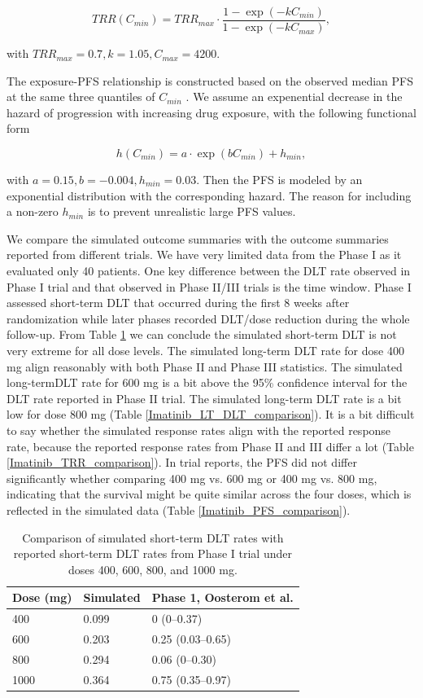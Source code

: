 \documentclass[11pt]{article}
\begin{document}
$$TRR(C_{min}) = TRR_{max} \cdot \frac{1-\exp (-kC_{min})}{1-\exp (-kC_{max})},$$

with $TRR_{max}=0.7, k=1.05, C_{max}=4200$.

The exposure-PFS relationship is constructed based on the observed median PFS at the same three quantiles of $C_{min}$ \parencite{demetri2009imatinib}. We assume an expenential decrease in the hazard of progression with increasing drug exposure, with the following functional form

$$h(C_{min}) = a \cdot \exp (bC_{min})+h_{min},$$

with $a=0.15, b=-0.004, h_{min}=0.03$. Then the PFS is modeled by an exponential distribution with the corresponding hazard. The reason for including a non-zero $h_{min}$ is to prevent unrealistic large PFS values. 

We compare the simulated outcome summaries with the outcome summaries reported from different trials. We have very limited data from the Phase I as it evaluated only 40 patients. One key difference between the DLT rate observed in Phase I trial and that observed in Phase II/III trials is the time window. Phase I assessed short-term DLT that occurred during the first 8 weeks after randomization while later phases recorded DLT/dose reduction during the whole follow-up. From Table \ref{Imatinib_ST_DLT_comparison} we can conclude the simulated short-term DLT is not very extreme for all dose levels. The simulated long-term DLT rate for dose 400 mg align reasonably with both Phase II and Phase III statistics. The simulated long-termDLT rate for 600 mg is a bit above the 95\% confidence interval for the DLT rate reported in Phase II trial. The simulated long-term DLT rate is a bit low for dose 800 mg (Table \ref{Imatinib_LT_DLT_comparison}). It is a bit difficult to say whether the simulated response rates align with the reported response rate, because the reported response rates from Phase II and III differ a lot (Table \ref{Imatinib_TRR_comparison}). In trial reports, the PFS did not differ significantly whether comparing 400 mg vs. 600 mg or 400 mg vs. 800 mg, indicating that the survival might be quite similar across the four doses, which is reflected in the simulated data (Table \ref{Imatinib_PFS_comparison}).

\begin{table}[htbp]
\centering
\caption{Comparison of simulated short-term DLT rates with reported short-term DLT rates from Phase I trial under doses 400, 600, 800, and 1000 mg.}
\label{Imatinib_ST_DLT_comparison}
\begin{tabular}{lll}
\toprule
\textbf{Dose (mg)} & \textbf{Simulated} & \textbf{Phase 1, Oosterom et al.} \\
\midrule
400  & 0.099 & 0 (0--0.37) \\
600  & 0.203 & 0.25 (0.03--0.65) \\
800  & 0.294 & 0.06 (0--0.30) \\
1000 & 0.364 & 0.75 (0.35--0.97) \\
\bottomrule
\end{tabular}
\end{table}
\end{document}
